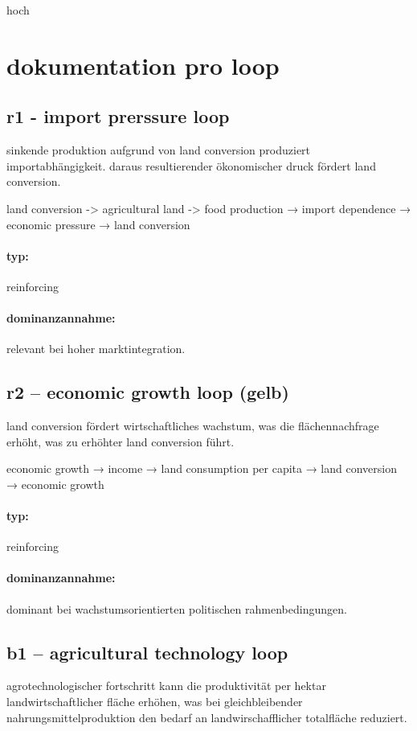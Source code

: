 \documentclass[11pt, a4paper, oneside]{scrartcl}
\begin{document}
hoch

\section{dokumentation pro loop}
\subsection{r1 - import prerssure loop}
sinkende produktion aufgrund von land conversion produziert importabhängigkeit. daraus resultierender ökonomischer druck fördert land conversion.

land conversion -> agricultural land -> food production → import dependence → economic pressure → land conversion

\paragraph{typ:}
reinforcing

\paragraph{dominanzannahme:}
relevant bei hoher marktintegration.

\subsection{r2 – economic growth loop (gelb)}
land conversion fördert wirtschaftliches wachstum, was die  flächennachfrage erhöht, was zu erhöhter land conversion führt.

economic growth → income → land consumption per capita → land conversion → economic growth

\paragraph{typ:}
reinforcing

\paragraph{dominanzannahme:}
dominant bei wachstumsorientierten politischen rahmenbedingungen.

\subsection{b1 – agricultural technology loop}
agrotechnologischer fortschritt kann die produktivität per hektar landwirtschaftlicher fläche erhöhen, 
was bei gleichbleibender nahrungsmittelproduktion den bedarf an landwirschafflicher totalfläche  reduziert.
\end{document}
